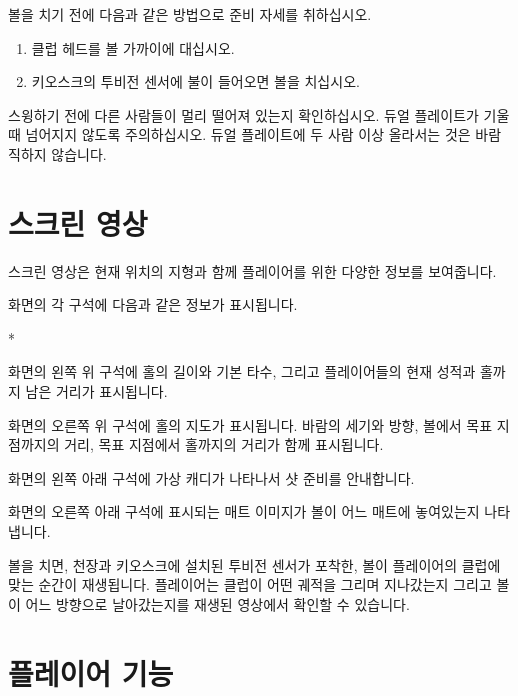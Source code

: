 \documentclass[10pt, openright, language=korean]{hzguide}
\begin{document}
볼을 치기 전에 다음과 같은 방법으로 준비 자세를 취하십시오.

\begin{enumerate}
\item 클럽 헤드를 볼 가까이에 대십시오. 
\item 키오스크의 투비전 센서에 불이 들어오면 볼을 치십시오. 
\end{enumerate}


\begin{Warning}
스윙하기 전에 다른 사람들이 멀리 떨어져 있는지 확인하십시오.
듀얼 플레이트가 기울 때 넘어지지 않도록 주의하십시오.
듀얼 플레이트에 두 사람 이상 올라서는 것은 바람직하지 않습니다.
\end{Warning}

\newpage
\section{스크린 영상}

스크린 영상은 현재 위치의 지형과 함께 플레이어를 위한 다양한 정보를 보여줍니다.


화면의 각 구석에 다음과 같은 정보가 표시됩니다.

\begin{callout}*
\item 화면의 왼쪽 위 구석에 홀의 길이와 기본 타수, 그리고 플레이어들의 현재 성적과 홀까지 남은 거리가 표시됩니다.
\item 화면의 오른쪽 위 구석에 홀의 지도가 표시됩니다. 바람의 세기와 방향, 볼에서 목표 지점까지의 거리, 목표 지점에서 홀까지의 거리가 함께 표시됩니다.
\item 화면의 왼쪽 아래 구석에 가상 캐디가 나타나서 샷 준비를 안내합니다.
\item 화면의 오른쪽 아래 구석에 표시되는 매트 이미지가 볼이 어느 매트에 놓여있는지 나타냅니다.
\end{callout}

볼을 치면, 천장과 키오스크에 설치된 투비전 센서가 포착한, 볼이 플레이어의 클럽에 맞는 순간이 재생됩니다.
플레이어는 클럽이 어떤 궤적을 그리며 지나갔는지 그리고 볼이 어느 방향으로 날아갔는지를 재생된 영상에서 확인할 수 있습니다.


\section{플레이어 기능}
\end{document}
